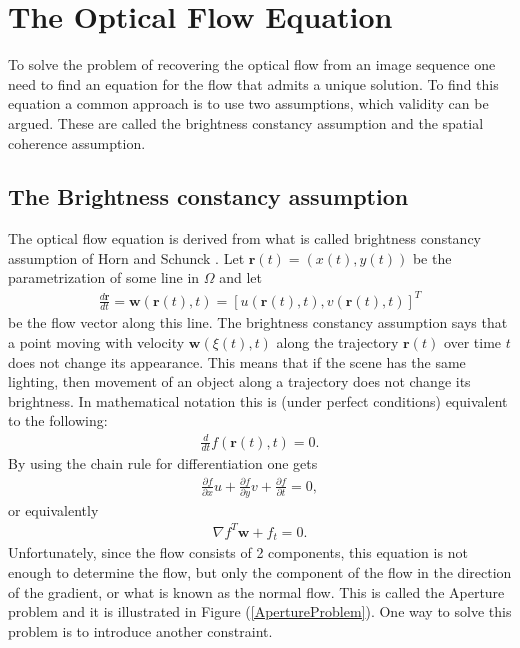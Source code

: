 \chapter{The Optical Flow Equation}
To solve the problem of recovering the optical flow from an image sequence one need to find an equation for the flow that admits a unique solution. To find this equation a common approach is to use two assumptions, which validity can be argued. These are called the brightness constancy assumption and the spatial coherence assumption.
\section{The Brightness constancy assumption}
\label{sec:BCA}
The optical flow equation is derived from what is called brightness constancy assumption of Horn and Schunck \cite{HS}. Let $\textbf{r}(t) = (x(t),y(t))$ be the parametrization of some line in $\Omega$ and let 
\begin{align*}
\frac{d \textbf{r}}{dt} = \textbf{w}(\textbf{r}(t),t) = \left[ u(\textbf{r}(t),t),v(\textbf{r}(t),t) \right]^T
\end{align*}
be the flow vector along this line. The brightness constancy assumption says that a point moving with velocity $\textbf{w}(\xi(t),t)$ along the trajectory $\textbf{r}(t)$ over time $t$ does not change its appearance. This means that if the scene has the same lighting, then movement of an object along a trajectory does not change its brightness. In mathematical notation this is (under perfect conditions) equivalent to the following:
\begin{align*}
\frac{d}{dt}f(\textbf{r}(t),t) = 0.
\end{align*}
By using the chain rule for differentiation one gets
\begin{align*}
\frac{\partial f}{\partial x} u + \frac{\partial f}{\partial y} v + \frac{\partial f}{\partial t} = 0,
\end{align*}
or equivalently
\begin{align}
\label{BC}
\nabla f^T  \textbf{w} + f_t = 0.
\end{align}
Unfortunately, since the flow consists of 2 components, this equation is not enough to determine the flow, but only the component of the flow in the direction of the gradient, or what is known as the normal flow. This is called the Aperture problem and it is illustrated in Figure (\ref{ApertureProblem}). One way to solve this problem is to introduce another constraint.

